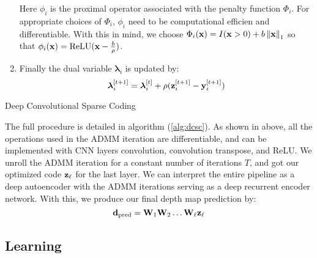 \begin{enumerate}
  Here $\phi_i$ is the proximal operator associated with the penalty function $\Phi_i$. For appropriate choices of $\Phi_i$, $\phi_i$ need to be computational efficien and differentiable. With this in mind, we choose $\Phi_i(\mathbf{x}) = I(\mathbf{x} > 0) + b\left\Vert\mathbf{x}\right\Vert_1$ so that $\phi_i(\mathbf{x}) = \text{ReLU}(\mathbf{x} - \frac{b}{\rho})$.
\item Finally the dual variable $\bm{\lambda}_i$ is updated by:
  \begin{equation}
    \label{eq:lupdate}
    \bm{\lambda}_i^{[t+1]} = \bm{\lambda}_i^{[t]} + \rho(\mathbf{z}_i^{[t+1]} - \mathbf{y}_i^{[t+1]})
  \end{equation}
\end{enumerate}
\begin{algorithm}
  \caption{Deep Convolutional Sparse Coding}
  \label{alg:dcsc}
\end{algorithm}

The full procedure is detailed in algorithm (\ref{alg:dcsc}).
As shown in above, all the operations used in the ADMM iteration are differentiable, and can be implemented with CNN layers \eg convolution, convolution transpose, and ReLU. We unroll the ADMM iteration for a constant number of iterations $T$, and got our optimized code $\mathbf{z}_\ell$ for the last layer.
We can interpret the entire pipeline as a deep autoencoder with the ADMM iterations serving as a deep recurrent encoder network.
With this, we produce our final depth map prediction by:
\begin{equation}
  \label{eq:8}
  \mathbf{d}_\text{pred} = \mathbf{W}_1\mathbf{W}_2\ldots \mathbf{W}_{\ell}\mathbf{z}_{\ell}
\end{equation}


\subsection{Learning}
\label{sec:dictionary-learning}

